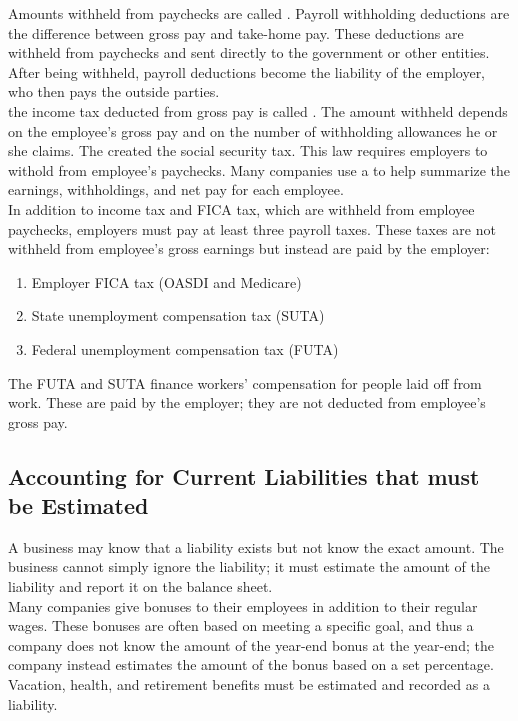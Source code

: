\documentclass{article}
\begin{document}
Amounts withheld from paychecks are called . Payroll withholding deductions are the difference between gross pay and take-home pay. These deductions are withheld from paychecks and sent directly to the government or other entities. After being withheld, payroll deductions become the liability of the employer, who then pays the outside parties. \\ 

the income tax deducted from gross pay is called . The amount withheld depends on the employee's gross pay and on the number of withholding allowances he or she claims. The  created the social security tax. This law requires employers to withold  from employee's paychecks. Many companies use a  to help summarize the earnings, withholdings, and net pay for each employee. \\ 

In addition to income tax and FICA tax, which are withheld from employee paychecks, employers must pay at least three payroll taxes. These taxes are not withheld from employee's gross earnings but instead are paid by the employer:
\begin{enumerate}
  \item Employer FICA tax (OASDI and Medicare)
  \item State unemployment compensation tax (SUTA)
  \item Federal unemployment compensation tax (FUTA)
\end{enumerate}
The FUTA and SUTA finance workers' compensation for people laid off from work. These  are paid by the employer; they are not deducted from employee's gross pay. 

\subsection{Accounting for Current Liabilities that must be Estimated}

A business may know that a liability exists but not know the exact amount. The business cannot simply ignore the liability; it must estimate the amount of the liability and report it on the balance sheet. \\ 

Many companies give bonuses to their employees in addition to their regular wages. These bonuses are often based on meeting a specific goal, and thus a company does not know the amount of the year-end bonus at the year-end; the company instead estimates the amount of the bonus based on a set percentage. Vacation, health, and retirement benefits must be estimated and recorded as a liability. \\ 
\end{document}
